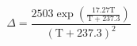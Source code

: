 \documentclass[12pt]{article}
\begin{document}
\begin{displaymath}
\Delta=\frac{2503 \exp \left(\frac{17.27 \mathrm{T}}{\mathrm{T}+237.3}\right)}{(\mathrm{T}+237.3)^{2}}
\end{displaymath}
\end{document}
